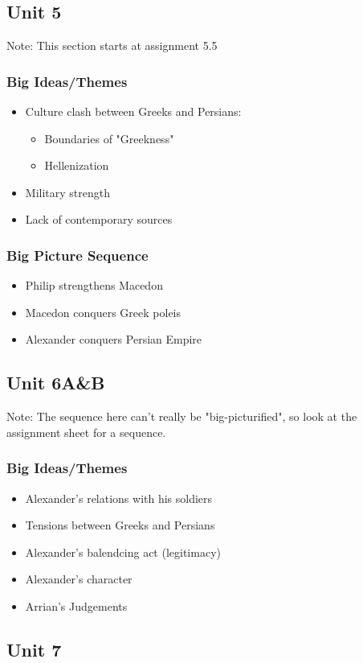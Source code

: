 \documentclass{article}
\begin{document}
\subsection*{Unit 5}
Note: This section starts at assignment 5.5
\subsubsection*{Big Ideas/Themes}
\begin{itemize}
  \item Culture clash between Greeks and Persians:
  \begin{itemize}
    \item Boundaries of "Greekness"
    \item Hellenization
  \end{itemize}
  \item Military strength
  \item Lack of contemporary sources
\end{itemize}
\subsubsection*{Big Picture Sequence}
\begin{itemize}
  \item Philip strengthens Macedon
  \item Macedon conquers Greek poleis
  \item Alexander conquers Persian Empire
\end{itemize}
\subsection*{Unit 6A\&B}
Note: The sequence here can't really be "big-picturified", so look at the assignment sheet
for a sequence.
\subsubsection*{Big Ideas/Themes}
\begin{itemize}
  \item Alexander's relations with his soldiers
  \item Tensions between Greeks and Persians
  \item Alexander's balendcing act (legitimacy)
  \item Alexander's character
  \item Arrian's Judgements
\end{itemize}
\subsection*{Unit 7}
\end{document}
